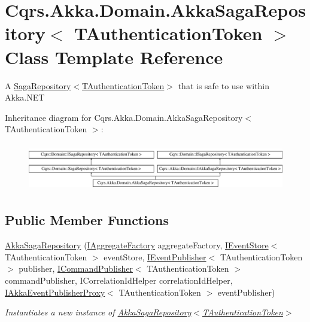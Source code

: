 \hypertarget{classCqrs_1_1Akka_1_1Domain_1_1AkkaSagaRepository}{}\section{Cqrs.\+Akka.\+Domain.\+Akka\+Saga\+Repository$<$ T\+Authentication\+Token $>$ Class Template Reference}
\label{classCqrs_1_1Akka_1_1Domain_1_1AkkaSagaRepository}


A \hyperlink{classCqrs_1_1Domain_1_1SagaRepository_ab444c7f3ace1ee0350d9f396345c395d_ab444c7f3ace1ee0350d9f396345c395d}{Saga\+Repository$<$\+T\+Authentication\+Token$>$} that is safe to use within Akka.\+N\+ET  


Inheritance diagram for Cqrs.\+Akka.\+Domain.\+Akka\+Saga\+Repository$<$ T\+Authentication\+Token $>$\+:\begin{figure}[H]
\begin{center}
\leavevmode
\includegraphics[height=2.105263cm]{classCqrs_1_1Akka_1_1Domain_1_1AkkaSagaRepository}
\end{center}
\end{figure}
\subsection*{Public Member Functions}
\begin{DoxyCompactItemize}
\item 
\hyperlink{classCqrs_1_1Akka_1_1Domain_1_1AkkaSagaRepository_a69f3c0de994f3e966f6ee475482af5f5_a69f3c0de994f3e966f6ee475482af5f5}{Akka\+Saga\+Repository} (\hyperlink{interfaceCqrs_1_1Domain_1_1Factories_1_1IAggregateFactory}{I\+Aggregate\+Factory} aggregate\+Factory, \hyperlink{interfaceCqrs_1_1Events_1_1IEventStore}{I\+Event\+Store}$<$ T\+Authentication\+Token $>$ event\+Store, \hyperlink{interfaceCqrs_1_1Events_1_1IEventPublisher}{I\+Event\+Publisher}$<$ T\+Authentication\+Token $>$ publisher, \hyperlink{interfaceCqrs_1_1Commands_1_1ICommandPublisher}{I\+Command\+Publisher}$<$ T\+Authentication\+Token $>$ command\+Publisher, I\+Correlation\+Id\+Helper correlation\+Id\+Helper, \hyperlink{interfaceCqrs_1_1Akka_1_1Events_1_1IAkkaEventPublisherProxy}{I\+Akka\+Event\+Publisher\+Proxy}$<$ T\+Authentication\+Token $>$ event\+Publisher)
\begin{DoxyCompactList}\small\item\em Instantiates a new instance of \hyperlink{classCqrs_1_1Akka_1_1Domain_1_1AkkaSagaRepository_a69f3c0de994f3e966f6ee475482af5f5_a69f3c0de994f3e966f6ee475482af5f5}{Akka\+Saga\+Repository$<$\+T\+Authentication\+Token$>$} \end{DoxyCompactList}\end{DoxyCompactItemize}
